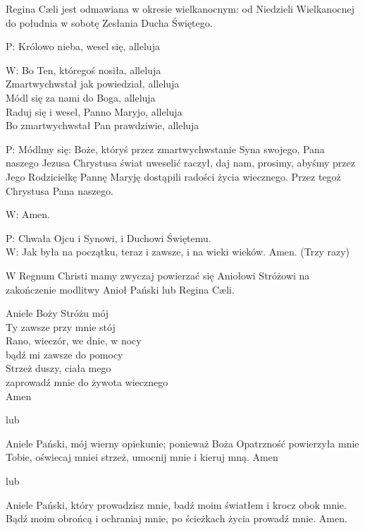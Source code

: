 ﻿\documentclass[9pt,twoside]{extarticle}
\begin{document}
{\hnr{}}


{\hnr Regina Cæli jest odmawiana w okresie wielkanocnym: od Niedzieli Wielkanocnej do południa w sobotę Zesłania Ducha Świętego.}


{\hnr P:} Królowo nieba, wesel się, alleluja


{\hnr W:} Bo Ten, któregoś nosiła, alleluja\\
Zmartwychwstał jak powiedział, alleluja\\
Módl się za nami do Boga, alleluja\\
Raduj się i wesel, Panno Maryjo, alleluja\\
Bo zmartwychwstał Pan prawdziwie, alleluja


{\hnr P:} Módlmy się: Boże, któryś przez zmartwychwstanie Syna swojego, Pana naszego Jezusa Chrystusa świat uweselić raczył, daj nam, prosimy, abyśmy przez Jego Rodzicielkę Pannę Maryję dostąpili radości życia wiecznego. Przez tegoż Chrystusa Pana naszego.


{\hnr W:} Amen.


{\hnr P:} Chwała Ojcu i Synowi, i Duchowi Świętemu.\\
{\hnr W:} Jak była na początku, teraz i  zawsze, i  na wieki wieków. Amen. (Trzy razy)


{\hnr{}}


{\hnr W Regnum Christi mamy zwyczaj powierzać się Aniołowi Stróżowi na zakończenie modlitwy Anioł Pański lub Regina Cæli.}


Aniele Boży Stróżu mój\\
Ty zawsze przy mnie stój\\
Rano, wieczór, we dnie, w nocy\\
bądź mi zawsze do pomocy\\
Strzeż duszy, ciała mego\\
zaprowadź mnie do żywota wiecznego\\
Amen


{\hnr lub}


Aniele Pański, mój wierny opiekunie; ponieważ Boża Opatrzność powierzyła mnie Tobie, oświecaj mnie\linebreak i strzeż, umocnij mnie i kieruj mną. Amen


{\hnr lub}


Aniele Pański, który prowadzisz mnie, badź moim światłem i krocz obok mnie. Bądź moim obrońcą i ochraniaj mnie, po ścieżkach życia prowadź mnie. Amen.
\end{document}
